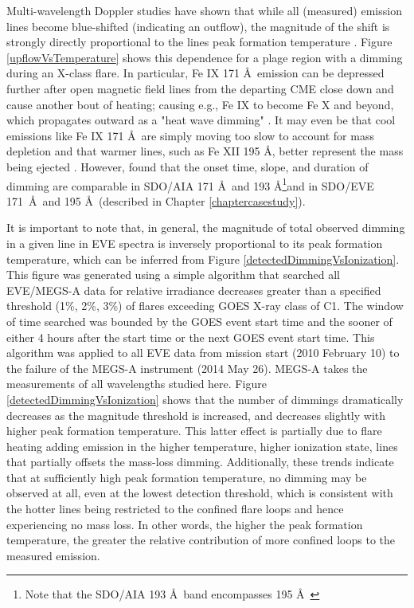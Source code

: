 Multi-wavelength Doppler studies have shown that while all (measured) emission lines become blue-shifted (indicating an outflow), the magnitude of the shift is strongly directly proportional to the lines peak formation temperature \citep{Imada2007, Jin2009}. Figure \ref{upflowVsTemperature} shows this dependence for a plage region with a dimming during an X-class flare. In particular, Fe IX 171 \AA\ emission can be depressed further after open magnetic field lines from the departing CME close down and cause another bout of heating; causing e.g., Fe IX to become Fe X and beyond, which propagates outward as a "heat wave dimming" \citep{Robbrecht2010}. It may even be that cool emissions like Fe IX 171 \AA\ are simply moving too slow to account for mass depletion and that warmer lines, such as Fe XII 195 \AA, better represent the mass being ejected \citep{Robbrecht2010}. However, \citet{Mason2014} found that the onset time, slope, and duration of dimming are comparable in SDO/AIA 171 \AA\ and 193 \AA\footnote{Note that the SDO/AIA 193 \AA\ band encompasses 195 \AA\ }and in SDO/EVE 171 \AA\ and 195 \AA\ (described in Chapter \ref{chaptercasestudy}). 

It is important to note that, in general, the magnitude of total observed dimming in a given line in EVE spectra is inversely proportional to its peak formation temperature, which can be inferred from Figure \ref{detectedDimmingVsIonization}. This figure was generated using a simple algorithm that searched all EVE/MEGS-A data for relative irradiance decreases greater than a specified threshold (1\%, 2\%, 3\%) of flares exceeding GOES X-ray class of C1. The window of time searched was bounded by the GOES event start time and the sooner of either 4 hours after the start time or the next GOES event start time. This algorithm was applied to all EVE data from mission start (2010 February 10) to the failure of the MEGS-A instrument (2014 May 26). MEGS-A takes the measurements of all wavelengths studied here. Figure \ref{detectedDimmingVsIonization} shows that the number of dimmings dramatically decreases as the magnitude threshold is increased, and decreases slightly with higher peak formation temperature. This latter effect is partially due to flare heating adding emission in the higher temperature, higher ionization state, lines that partially offsets the mass-loss dimming. Additionally, these trends indicate that at sufficiently high peak formation temperature, no dimming may be observed at all, even at the lowest detection threshold, which is consistent with the hotter lines being restricted to the confined flare loops and hence experiencing no mass loss. In other words, the higher the peak formation temperature, the greater the relative contribution of more confined loops to the measured emission. 

